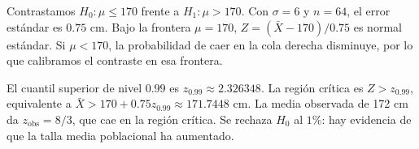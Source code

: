 Contrastamos $H_0:\mu\le170$ frente a $H_1:\mu>170$.
Con $\sigma=6$ y $n=64$, el error estándar es $0.75$ cm.
Bajo la frontera $\mu=170$,
$Z=(\bar X-170)/0.75$ es normal estándar. Si $\mu<170$,
la probabilidad de caer en la cola derecha disminuye, por
lo que calibramos el contraste en esa frontera.

El cuantil superior de nivel $0.99$ es $z_{0.99}\approx2.326348$.
La región crítica es $Z>z_{0.99}$, equivalente a
$\bar X>170+0.75z_{0.99}\approx171.7448$ cm.
La media observada de 172 cm da $z_{\mathrm{obs}}=8/3$,
que cae en la región crítica. Se rechaza $H_0$ al $1\%$:
hay evidencia de que la talla media poblacional ha aumentado.
